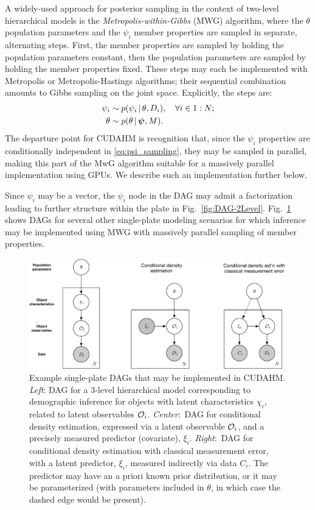 A widely-used approach for posterior sampling in the context of two-level hierarchical models is the \textit{Metropolis-within-Gibbs} (MWG) algorithm, where the $\theta$ population parameters and the $\psi_i$ member properties are sampled in separate, alternating steps.
First, the member properties are sampled by holding the population parameters constant, then the population parameters are sampled by holding the member properties fixed.
These steps may each be implemented with Metropolis or Metropolis-Hastings algorithms; their sequential combination amounts to Gibbs sampling on the joint space.
Explicitly, the steps are:
\begin{align}
\psi_i &\sim p(\psi_i \,|\, \theta, D_i), \quad\forall i\in 1:N;
\label{eq:psi_sampling} \\
\theta &\sim p(\theta \,|\, \boldsymbol{\psi}, M).
\label{eq:theta_sampling}
\end{align}
The departure point for CUDAHM is recognition that, since the $\psi_i$ properties are conditionally independent in \eqref{eq:psi_sampling}, they may be sampled in parallel, making this part of the MwG algorithm suitable for a massively parallel implementation using GPUs.
We describe such an implementation further below.

Since $\psi_i$ may be a vector, the $\psi_i$ node in the DAG may admit a factorization leading to further structure within the plate in Fig.~\ref{fig:DAG-2Level}.
Fig.~\ref{fig:DAGs} shows DAGs for several other single-plate modeling scenarios for which inference may be implemented using MWG with massively parallel sampling of member properties.

\begin{figure}
\begin{center}
\includegraphics[width=.9\textwidth]{fig/DAGs-3}
\end{center}
\caption{Example single-plate DAGs that may be implemented in CUDAHM.
\emph{Left}: DAG for a 3-level hierarchical model corresponding to demographic inference for objects with latent characteristics $\chi_i$, related to latent observables $\mathcal{O}_i$.
\emph{Center}:~DAG for conditional density estimation, expressed via a latent observable $\mathcal{O}_i$, and a precisely measured predictor (covariate), $\xi_i$.
\emph{Right}:~DAG for conditional density estimation with classical measurement error, with a latent predictor, $\xi_i$, measured indirectly via data $C_i$.
The predictor may have an a priori known prior distribution, or it may be parameterized (with parameters included in $\theta$, in which case the dashed edge would be present).}
\label{fig:DAGs}
\end{figure}

